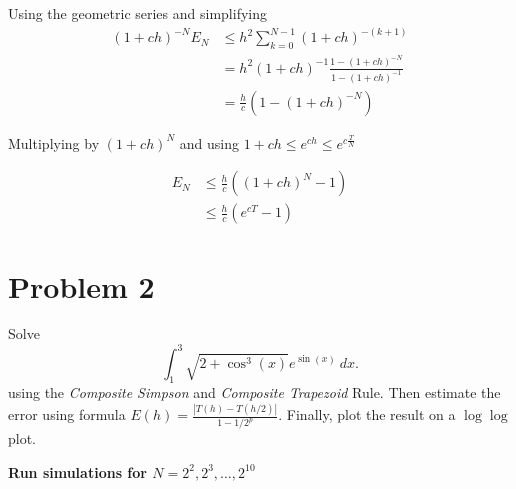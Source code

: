 \documentclass[12pt,a4paper]{article}
\begin{document}
Using the geometric series and simplifying
\begin{align*}
  (1+ch)^{-N}E_N &\leq h^2 \sum^{N-1}_{k=0} \left(1+ch\right)^{-(k+1)} \\
                 &= h^2 (1+ch)^{-1} \frac{1-(1+ch)^{-N}}{1-(1+ch)^{-1}}\\
                 &= \frac{h}{c} \left(1-(1+ch)^{-N}\right)
\end{align*}

Multiplying by $(1+ch)^{N}$ and using $1+ch\leq e^{ch} \leq e^{c \frac{T}{N}}$

\begin{align*}
  E_N &\leq \frac{h}{c} \left((1+ch)^{N}-1\right) \\
      &\leq \frac{h}{c} (e^{cT} - 1)
\end{align*}

\section{Problem 2}
Solve 
\[
  \int_{{1}}^{{3}} {\sqrt{2+\cos^3(x)}e^{\sin(x)}} \: d{x} {}
.\] 
using the \emph{Composite Simpson} and \emph{Composite Trapezoid} Rule.  Then
estimate the error using formula $E(h) = \frac{|T(h)-T(h/2)|}{1-1/2^p}$.
Finally, plot the result on a $\log\log$ plot.


\textbf{Run simulations for $N = 2^2, 2^3, \ensuremath{\ldots},2^{10}$}
\end{document}
